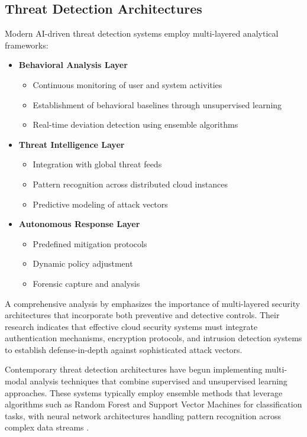 \documentclass[a4paper,12pt]{article}
\begin{document}
\subsection{Threat Detection Architectures}
Modern AI-driven threat detection systems employ multi-layered analytical frameworks:
\begin{itemize}
    \item \textbf{Behavioral Analysis Layer}
          \begin{itemize}
              \item Continuous monitoring of user and system activities
              \item Establishment of behavioral baselines through unsupervised learning
              \item Real-time deviation detection using ensemble algorithms
          \end{itemize}
    \item \textbf{Threat Intelligence Layer}
          \begin{itemize}
              \item Integration with global threat feeds
              \item Pattern recognition across distributed cloud instances
              \item Predictive modeling of attack vectors
          \end{itemize}
    \item \textbf{Autonomous Response Layer}
          \begin{itemize}
              \item Predefined mitigation protocols
              \item Dynamic policy adjustment
              \item Forensic capture and analysis
          \end{itemize}
\end{itemize}

A comprehensive analysis by \citet{alouffi2021} emphasizes the importance of multi-layered security architectures that incorporate both preventive and detective controls. Their research indicates that effective cloud security systems must integrate authentication mechanisms, encryption protocols, and intrusion detection systems to establish defense-in-depth against sophisticated attack vectors.

Contemporary threat detection architectures have begun implementing multi-modal analysis techniques that combine supervised and unsupervised learning approaches. These systems typically employ ensemble methods that leverage algorithms such as Random Forest and Support Vector Machines for classification tasks, with neural network architectures handling pattern recognition across complex data streams \citet{sarker2023}.
\end{document}
